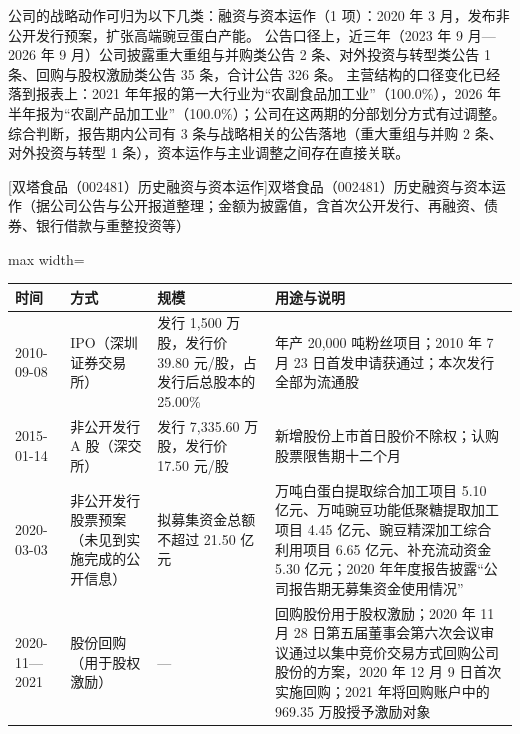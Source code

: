  公司的战略动作可归为以下几类：融资与资本运作（1 项）：2020 年 3 月，发布非公开发行预案，扩张高端豌豆蛋白产能。 公告口径上，近三年（2023 年 9 月---2026 年 9 月）公司披露重大重组与并购类公告 2 条、对外投资与转型类公告 1 条、回购与股权激励类公告 35 条，合计公告 326 条。 主营结构的口径变化已经落到报表上：2021 年年报的第一大行业为“农副食品加工业”（100.0\%），2026 年半年报为“农副产品加工业”（100.0\%）；公司在这两期的分部划分方式有过调整。 综合判断，报告期内公司有 3 条与战略相关的公告落地（重大重组与并购 2 条、对外投资与转型 1 条），资本运作与主业调整之间存在直接关联。

\begin{center}\small\setlength{\tabcolsep}{4pt}
[双塔食品（002481）历史融资与资本运作]{双塔食品（002481）历史融资与资本运作（据公司公告与公开报道整理；金额为披露值，含首次公开发行、再融资、债券、银行借款与重整投资等）}
\begin{adjustbox}{max width=\textwidth}
\begin{tabular}{@{}p{1.45cm}p{2.55cm}p{4.05cm}p{4.95cm}@{}}
\toprule
时间 & 方式 & 规模 & 用途与说明 \\
\midrule
2010-09-08 & IPO（深圳证券交易所） & 发行 1,\allowbreak{}500 万股，\allowbreak{}发行价 39.80 元/\allowbreak{}股，\allowbreak{}占发行后总股本的 25.00\% & 年产 20,\allowbreak{}000 吨粉丝项目；2010 年 7 月 23 日首发申请获通过；本次发行全部为流通股 \\
2015-01-14 & 非公开发行 A 股（深交所） & 发行 7,\allowbreak{}335.60 万股，\allowbreak{}发行价 17.50 元/\allowbreak{}股 & 新增股份上市首日股价不除权；认购股票限售期十二个月 \\
2020-03-03 & 非公开发行股票预案（未见到实施完成的公开信息） & 拟募集资金总额不超过 21.50 亿元 & 万吨白蛋白提取综合加工项目 5.10 亿元、\allowbreak{}万吨豌豆功能低聚糖提取加工项目 4.45 亿元、\allowbreak{}豌豆精深加工综合利用项目 6.65 亿元、\allowbreak{}补充流动资金 5.30 亿元；2020 年年度报告披露“公司报告期无募集资金使用情况” \\
2020-11—2021 & 股份回购（用于股权激励） & --- & 回购股份用于股权激励；2020 年 11 月 28 日第五届董事会第六次会议审议通过以集中竞价交易方式回购公司股份的方案，\allowbreak{}2020 年 12 月 9 日首次实施回购；2021 年将回购账户中的 969.35 万股授予激励对象 \\
\bottomrule
\end{tabular}
\end{adjustbox}
\end{center}

